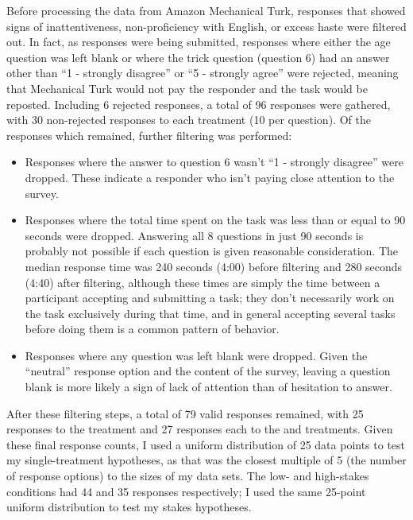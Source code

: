 Before processing the data from Amazon Mechanical Turk, responses that showed signs of inattentiveness, non-proficiency with English, or excess haste were filtered out.
%
In fact, as responses were being submitted, responses where either the age question was left blank or where the trick question (question 6) had an answer other than ``1 - strongly disagree'' or ``5 - strongly agree'' were rejected, meaning that Mechanical Turk would not pay the responder and the task would be reposted.
%
Including 6 rejected responses, a total of 96 responses were gathered, with 30 non-rejected responses to each treatment (10 per question).
%
Of the responses which remained, further filtering was performed:
%
\begin{itemize}
  \item Responses where the answer to question 6 wasn't ``1 - strongly disagree'' were dropped. These indicate a responder who isn't paying close attention to the survey.
  \item Responses where the total time spent on the task was less than or equal to 90 seconds were dropped. Answering all 8 questions in just 90 seconds is probably not possible if each question is given reasonable consideration. The median response time was 240 seconds (4:00) before filtering and 280 seconds (4:40) after filtering, although these times are simply the time between a participant accepting and submitting a task; they don't necessarily work on the task exclusively during that time, and in general accepting several tasks before doing them is a common pattern of behavior.
  \item Responses where any question was left blank were dropped. Given the ``neutral'' response option and the content of the survey, leaving a question blank is more likely a sign of lack of attention than of hesitation to answer.
\end{itemize}
%
After these filtering steps, a total of 79 valid responses remained, with 25 responses to the \obv{} treatment and 27 responses each to the \rlx{} and \dlm{} treatments.
%
Given these final response counts, I used a uniform distribution of 25 data points to test my single-treatment hypotheses, as that was the closest multiple of 5 (the number of response options) to the sizes of my data sets.
%
The low- and high-stakes conditions had 44 and 35 responses respectively; I used the same 25-point uniform distribution to test my stakes hypotheses.



